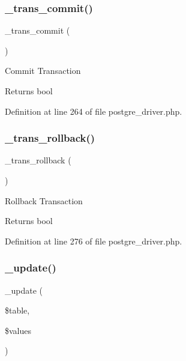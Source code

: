 \subsubsection{\texorpdfstring{\_trans\_commit()}{\_trans\_commit()}}
{\footnotesize\ttfamily \+\_\+trans\+\_\+commit (\begin{DoxyParamCaption}{ }\end{DoxyParamCaption})\hspace{0.3cm}{\ttfamily [protected]}}

Commit Transaction

\begin{DoxyReturn}{Returns}
bool 
\end{DoxyReturn}


Definition at line 264 of file postgre\+\_\+driver.\+php.

\mbox{\label{class_c_i___d_b__postgre__driver_ad49a116b0776c26b53114c9093fd102a}} 
\subsubsection{\texorpdfstring{\_trans\_rollback()}{\_trans\_rollback()}}
{\footnotesize\ttfamily \+\_\+trans\+\_\+rollback (\begin{DoxyParamCaption}{ }\end{DoxyParamCaption})\hspace{0.3cm}{\ttfamily [protected]}}

Rollback Transaction

\begin{DoxyReturn}{Returns}
bool 
\end{DoxyReturn}


Definition at line 276 of file postgre\+\_\+driver.\+php.

\mbox{\label{class_c_i___d_b__postgre__driver_a2540b03a93fa73ae74c10d0e16fc073e}} 
\subsubsection{\texorpdfstring{\_update()}{\_update()}}
{\footnotesize\ttfamily \+\_\+update (\begin{DoxyParamCaption}\item[{}]{\$table,  }\item[{}]{\$values }\end{DoxyParamCaption})\hspace{0.3cm}{\ttfamily [protected]}}

